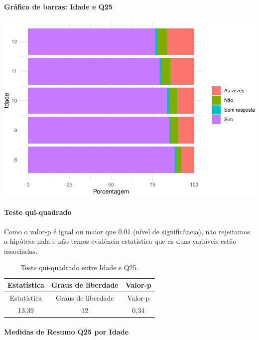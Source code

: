 \documentclass[]{article}
\let\oldparagraph\paragraph
\renewcommand{\paragraph}[1]{\oldparagraph{#1}\mbox{}}
\begin{document}
\hypertarget{gruxe1fico-de-barras-idade-e-q25}{%
\paragraph{Gráfico de barras: Idade e Q25}\label{gruxe1fico-de-barras-idade-e-q25}}

\begin{center}\includegraphics[width=0.75\linewidth]{relatorio_covid19_files/figure-latex/unnamed-chunk-683-1} \end{center}

\hypertarget{teste-qui-quadrado-59}{%
\paragraph{Teste qui-quadrado}\label{teste-qui-quadrado-59}}

Como o valor-p é igual ou maior que 0.01 (nível de significância), não rejeitamos a hipótese nula e não temos evidência estatística que as duas variáveis estão associadas.

\begin{longtable}[]{@{}ccc@{}}
\caption{\label{tab:unnamed-chunk-685}Teste qui-quadrado entre Idade e Q25.}\tabularnewline
\toprule
Estatística & Graus de liberdade & Valor-p\tabularnewline
\midrule
\endfirsthead
\toprule
Estatística & Graus de liberdade & Valor-p\tabularnewline
\midrule
\endhead
13,39 & 12 & 0,34\tabularnewline
\bottomrule
\end{longtable}

\cleardoublepage

\hypertarget{medidas-de-resumo-q25-por-idade}{%
\paragraph{Medidas de Resumo Q25 por Idade}\label{medidas-de-resumo-q25-por-idade}}
\end{document}
